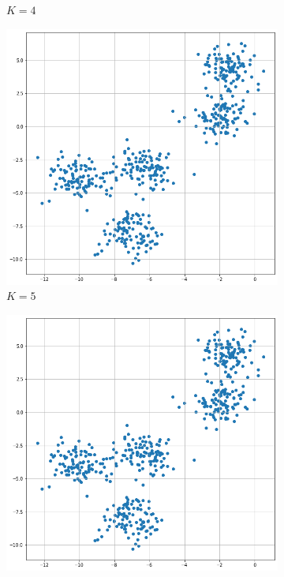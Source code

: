 \documentclass[12pt]{article}
\begin{document}
\begin{enumerate}
\begin{figure}[!h]
\begin{subfigure}[b]{0.25\textwidth}
         \caption{$K=4$}
         \label{fig:K4}
     \end{subfigure}
        \label{fig:three graphs}
\vfill
     \centering
     \begin{subfigure}[d]{0.25\textwidth}
         \centering
         \includegraphics[width=\textwidth]{fig/hw2_q1.png}
         \caption{$K=5$}
         \label{fig:K5}
     \end{subfigure}
     \begin{subfigure}[e]{0.25\textwidth}
         \centering
         \includegraphics[width=\textwidth]{fig/hw2_q1.png}

\end{subfigure}
\end{figure}
\end{enumerate}
\end{document}
